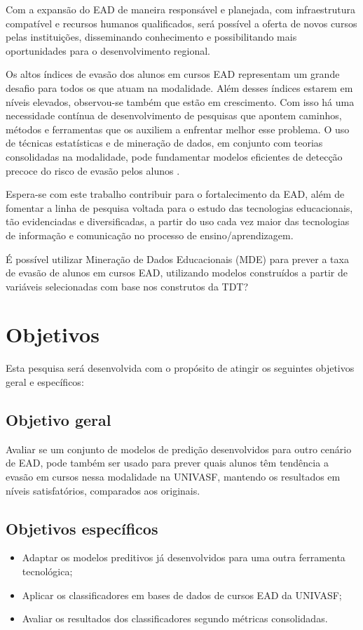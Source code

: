 Com a expansão do EAD de maneira responsável e planejada, com infraestrutura
compatível e recursos humanos qualificados, será possível a oferta de novos
cursos pelas instituições, disseminando conhecimento e possibilitando mais
oportunidades para o desenvolvimento regional.

Os altos índices de evasão dos alunos em cursos EAD representam um grande
desafio para todos os que atuam na modalidade. Além desses índices estarem em
níveis elevados, observou-se também que estão em crescimento. Com isso há uma
necessidade contínua de desenvolvimento de pesquisas que apontem caminhos,
métodos e ferramentas que os auxiliem a enfrentar melhor esse problema. O uso de
técnicas estatísticas e de mineração de dados, em conjunto com teorias
consolidadas na modalidade, pode fundamentar modelos eficientes de detecção
precoce do risco de evasão pelos alunos \cite{ramos2016abordagem}.

Espera-se com este trabalho contribuir para o fortalecimento da EAD, além de
fomentar a linha de pesquisa voltada para o estudo das tecnologias educacionais,
tão evidenciadas e diversificadas, a partir do uso cada vez maior das
tecnologias de informação e comunicação no processo de ensino/aprendizagem.

É possível utilizar Mineração de Dados Educacionais (MDE) para prever a taxa de
evasão de alunos em cursos EAD, utilizando modelos construídos a partir de
variáveis selecionadas com base nos construtos da TDT?

\section{Objetivos}

Esta pesquisa será desenvolvida com o propósito de atingir os seguintes
objetivos geral e específicos:

\subsection{Objetivo geral}

Avaliar se um conjunto de modelos de predição desenvolvidos para outro cenário
de EAD, pode também ser usado para prever quais alunos têm tendência a evasão em
cursos nessa modalidade na UNIVASF, mantendo os resultados em níveis
satisfatórios, comparados aos originais.

\subsection{Objetivos específicos}
\begin{itemize}
  \item Adaptar os modelos preditivos já desenvolvidos para uma outra ferramenta
  tecnológica;
  \item Aplicar os classificadores em bases de dados de cursos EAD da UNIVASF;
  \item Avaliar os resultados dos classificadores segundo métricas consolidadas.
\end{itemize}


